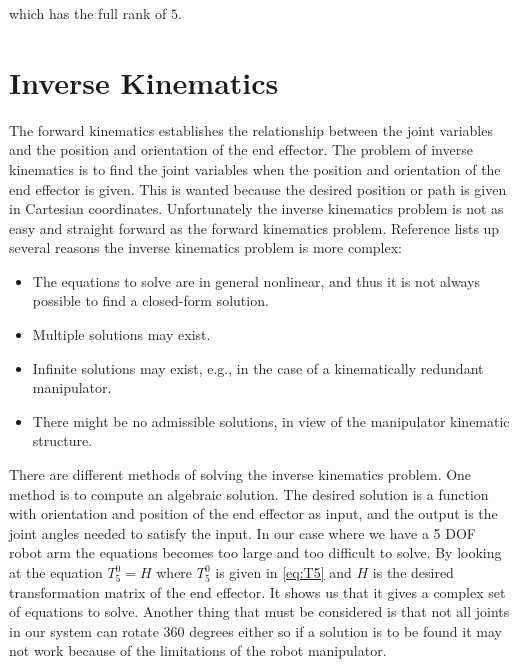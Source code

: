 which has the full rank of $5$. 

















\section{Inverse Kinematics}
The forward kinematics establishes the relationship between the joint variables and the position and orientation of the end effector. The problem of inverse kinematics is to find the joint variables when the position and orientation of the end effector is given. This is wanted because the desired position or path is given in Cartesian coordinates. Unfortunately the inverse kinematics problem is not as easy and straight forward as the forward kinematics problem. Reference \cite{Siciliano} lists up several reasons the inverse kinematics problem is more complex:
\begin{itemize}
    \item The equations to solve are in general nonlinear, and thus it is not always possible to find a closed-form solution.
    \item Multiple solutions may exist.
    \item Infinite solutions may exist, e.g., in the case of a kinematically redundant manipulator.
    \item There might be no admissible solutions, in view of the manipulator kinematic structure.
\end{itemize}
There are different methods of solving the inverse kinematics problem. One method is to compute an algebraic solution. The desired solution is a function with orientation and position of the end effector as input, and the output is the joint angles needed to satisfy the input. In our case where we have a 5 DOF robot arm the equations becomes too large and too difficult to solve\cite{spong}. By looking at the equation $T_5^0=H$ where $T_5^0$ is given in \eqref{eq:T5} and $H$ is the desired transformation matrix of the end effector. It shows us that it gives a complex set of equations to solve. Another thing that must be considered is that not all joints in our system can rotate 360 degrees either so if a solution is to be found it may not work because of the limitations of the robot manipulator. \\\\

